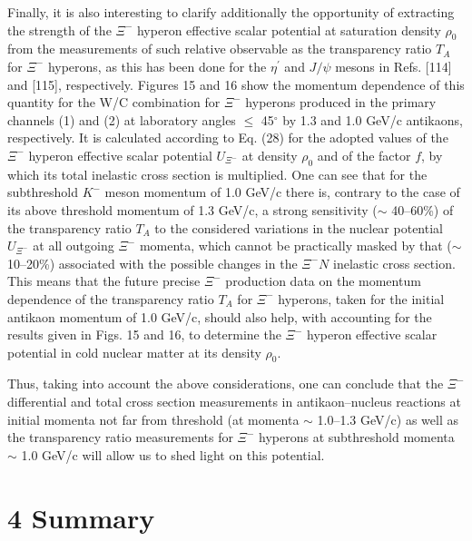 \documentclass[12pt]{article}
\begin{document}
Finally, it is also interesting to clarify additionally the opportunity of extracting the strength
of the ${\Xi^-}$ hyperon effective scalar potential at saturation density $\rho_0$
from the measurements of such relative observable as the transparency ratio $T_A$ for $\Xi^-$ hyperons,
as this has been done for the $\eta^{\prime}$ and $J/\psi$ mesons in Refs. [114] and [115], respectively.
Figures 15 and 16 show the momentum dependence of this quantity for the W/C combination
for $\Xi^-$ hyperons produced in the primary channels (1) and (2) at laboratory angles $\le$ 45$^{\circ}$
by 1.3 and 1.0 GeV/c antikaons, respectively. It is calculated according to Eq. (28)
for the adopted values of the $\Xi^-$  hyperon effective scalar potential $U_{\Xi^-}$ at density $\rho_0$
and of the factor $f$, by which its total inelastic cross section is multiplied.
One can see that for the subthreshold $K^-$ meson momentum of 1.0 GeV/c there is, contrary to the case of
its above threshold momentum of 1.3 GeV/c, a strong sensitivity ($\sim$ 40--60\%) of the
transparency ratio $T_A$ to the considered variations in the nuclear potential $U_{\Xi^-}$ at all outgoing
$\Xi^-$ momenta, which cannot be practically masked by that ($\sim$ 10--20\%) associated with
the possible changes in the ${\Xi^-}N$ inelastic cross section. This means that the future precise
$\Xi^-$ production data on the momentum dependence of the transparency ratio $T_A$ for $\Xi^-$ hyperons,
taken for the initial antikaon momentum of 1.0 GeV/c, should also help, with accounting for
the results given in Figs. 15 and 16, to determine the $\Xi^-$ hyperon effective scalar potential
in cold nuclear matter at its density $\rho_0$.

Thus, taking into account the above considerations, one can conclude that the
$\Xi^-$ differential and total cross section measurements in antikaon--nucleus reactions at initial
momenta not far from threshold (at momenta $\sim$ 1.0--1.3 GeV/c) as well as the transparency ratio
measurements for $\Xi^-$ hyperons at subthreshold momenta $\sim$ 1.0 GeV/c
will allow us to shed light on this potential.

\section*{4 Summary}
\end{document}
